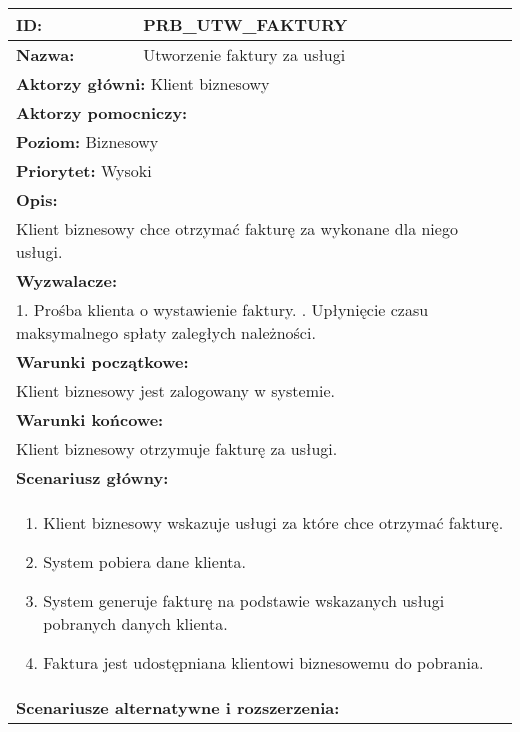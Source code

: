 \begin{center}
\begin{longtable}[h]{|p{1.6cm}|p{13.5cm}|}
\hline
\textbf{ID:} & PRB\_UTW\_FAKTURY \\ \hline
\textbf{Nazwa:} & Utworzenie faktury za usługi \\ \hline
\multicolumn{2}{|p{15.1cm}|}{\textbf{Aktorzy główni:} Klient biznesowy} \\
\multicolumn{2}{|p{15.1cm}|}{\textbf{Aktorzy pomocniczy:} } \\
\multicolumn{2}{|p{15.1cm}|}{\textbf{Poziom:}  Biznesowy} \\
\multicolumn{2}{|p{15.1cm}|}{\textbf{Priorytet:}  Wysoki} \\
\hline
\multicolumn{2}{|p{15.1cm}|}{\textbf{Opis:}} \\
\multicolumn{2}{|p{15.1cm}|}{
Klient biznesowy chce otrzymać fakturę za wykonane dla niego usługi.
} \\ \hline
\multicolumn{2}{|p{15.1cm}|}{\textbf{Wyzwalacze:}} \\
\multicolumn{2}{|p{15.1cm}|}{
1. Prośba klienta o wystawienie faktury. \newline
2. Upłynięcie czasu maksymalnego spłaty zaległych należności.
} \\ \hline
\multicolumn{2}{|p{15.1cm}|}{\textbf{Warunki początkowe:}} \\
\multicolumn{2}{|p{15.1cm}|}{
Klient biznesowy jest zalogowany w systemie.
} \\ \hline
\multicolumn{2}{|p{15.1cm}|}{\textbf{Warunki końcowe:}} \\
\multicolumn{2}{|p{15.1cm}|}{
Klient biznesowy otrzymuje fakturę za usługi.
} \\ \hline
\multicolumn{2}{|p{15.1cm}|}{\textbf{Scenariusz główny:}} \\
\multicolumn{2}{|p{15.1cm}|}{
\begin{enumerate}
\item Klient biznesowy wskazuje usługi za które chce otrzymać fakturę.
\item System pobiera dane klienta. \label{sec:pobra_dan_kl}
\item System generuje fakturę na podstawie wskazanych usługi pobranych danych klienta.
\item Faktura jest udostępniana klientowi biznesowemu do pobrania.
\end{enumerate}
} \\ \hline
\multicolumn{2}{|p{15.1cm}|}{\textbf{Scenariusze alternatywne i rozszerzenia:}} \\

\end{longtable}
\end{center}
